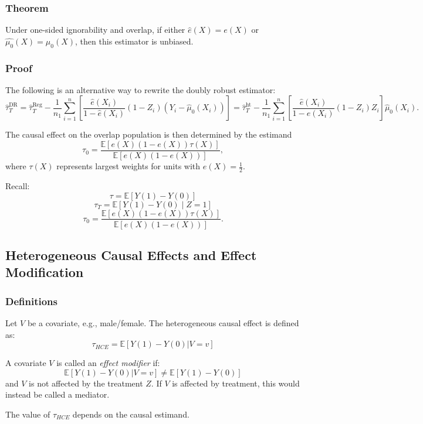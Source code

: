 \subsubsection{Theorem}

Under one-sided ignorability and overlap, if either $\hat{e}(X) = e(X)$ or $\hat{\mu_0}(X) = \mu_0(X)$, then this estimator is unbiased.

\subsubsection{Proof}

The following is an alternative way to rewrite the doubly robust estimator: $$\hat{\tau}_T^{\text{DR}} = \hat{\tau}_T^{\text{Reg}} - \frac{1}{n_1} \sum_{i=1}^{n} \left[\frac{\hat{e}(X_i)}{1 - \hat{e}(X_i)} (1-Z_i)(Y_i - \hat{\mu}_0(X_i))\right] = \hat{\tau}_T^{\text{ht}} - \frac{1}{n_1} \sum_{i=1}^{n} \left[\frac{\hat{e}(X_i)}{1 - \hat{e}(X_i)} (1-Z_i) Z_i \right]\hat{\mu}_0(X_i).$$

The causal effect on the overlap population is then determined by the estimand 
$$\tau_0 = \frac{\mathbb{E}[e(X)(1-e(X))\tau(X)]}{\mathbb{E}[e(X)(1-e(X))]},$$ where $\tau(X)$ represents largest weights for units with $e(X) = \frac{1}{2}.$

Recall: 
$$\tau = \mathbb{E}[Y(1) - Y(0)]$$
$$\tau_{T} = \mathbb{E}[Y(1)-Y(0) \mid Z=1]$$
$$\tau_0 = \frac{\mathbb{E}[e(X)(1-e(X))\tau(X)]}{\mathbb{E}[e(X)(1-e(X))]}.$$

\subsection{Heterogeneous Causal Effects and Effect Modification}

\subsubsection{Definitions}

Let $V$ be a covariate, e.g., male/female. The heterogeneous causal effect is defined as:
\[
\tau_{HCE} = \mathbb{E}[Y(1) - Y(0) | V = v]
\]

A covariate $V$ is called an \emph{effect modifier} if:
\[
\mathbb{E}[Y(1) - Y(0) | V = v] \neq \mathbb{E}[Y(1) - Y(0)]
\]
and $V$ is not affected by the treatment $Z$. If $V$ is affected by treatment, this would instead be called a mediator.

The value of $\tau_{HCE}$ depends on the causal estimand.

